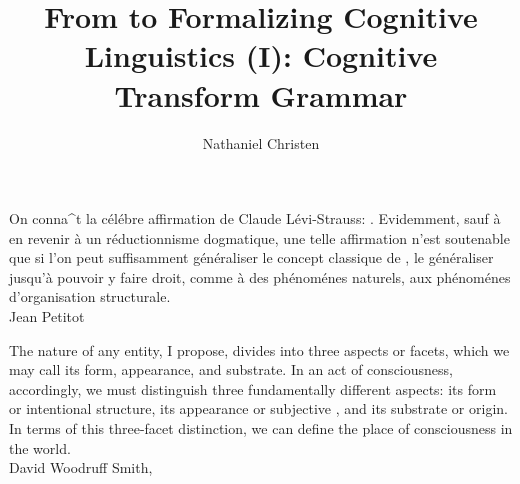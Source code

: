 \documentclass[10pt,twocolumn]{article}
\begin{document}
\title{From  to 
Formalizing Cognitive Linguistics (I): Cognitive Transform Grammar}
\author{Nathaniel Christen}

\newsavebox{\qboxi}
\newsavebox{\qboxii}

\begin{lrbox}{\qboxi}
\begin{frquote}
On conna\^{\inodot}t la c\'{e}l\'{e}bre 
affirmation de Claude L\'{e}vi-Strauss:
.  Evidemment, sauf 
\`{a} en revenir \`{a} un r\'{e}ductionnisme dogmatique, une telle
affirmation n'est soutenable que si l'on peut suffisamment 
g\'{e}n\'{e}raliser le concept
classique de , 
le g\'{e}n\'{e}raliser jusqu'\`{a} pouvoir y faire droit, 
comme \`{a} des ph\'{e}nom\'{e}nes naturels, aux 
ph\'{e}nom\'{e}nes d'organisation structurale. 
\\ \longdash{} Jean Petitot \cite[p. 1]{PetitotSyntaxe}
\end{frquote}
\end{lrbox}

\begin{lrbox}{\qboxii}
\begin{frquote}
The nature of any entity, I propose, divides into three aspects 
or facets, which we may call its form, appearance, and substrate.  
In an act of consciousness, accordingly, we must distinguish three 
fundamentally different aspects: its form or intentional structure, 
its appearance or subjective , and its substrate or 
origin.  In terms of this three-facet distinction, we can define 
the place of consciousness in the world.
\\ \longdash{} David Woodruff Smith, \cite[p. 11]{DavidWoodruffSmith}
\end{frquote}
\end{lrbox}

\end{document}
